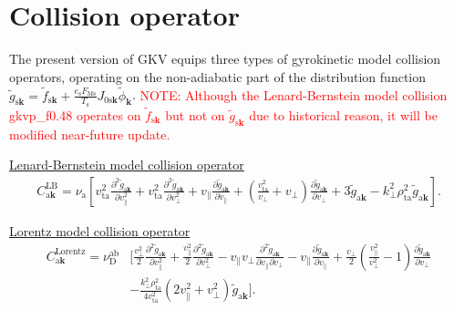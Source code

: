 \section{Collision operator}
\label{sec:Collision operator}

The present version of GKV equips three types of gyrokinetic model collision operators, operating on the non-adiabatic part of the distribution function $\tilde{g}_{\mathrm{s}\bm{k}} = \tilde{f}_{\mathrm{s}\bm{k}} + \frac{e_\mathrm{s} F_\mathrm{Ms}}{T_\mathrm{s}} J_{0\mathrm{s}\bm{k}} \tilde{\phi}_{\bm{k}}$. \textcolor{red}{NOTE: Although the Lenard-Bernstein model collision gkvp\_f0.48 operates on $\tilde{f}_{\mathrm{s}\bm{k}}$ but not on $\tilde{g}_{\mathrm{s}\bm{k}}$ due to historical reason, it will be modified near-future update.}

\underline{Lenard-Bernstein model collision operator}\\
\begin{align}
  C_{\mathrm{a}\bm{k}}^\mathrm{LB} = \nu_\mathrm{a} \left[ v_\mathrm{ta}^2 \frac{\partial^2 \tilde{g}_{\mathrm{a}\bm{k}}}{\partial v_\parallel^2} + v_\mathrm{ta}^2 \frac{\partial^2 \tilde{g}_{\mathrm{a}\bm{k}}}{\partial v_\perp^2} + v_\parallel \frac{\partial \tilde{g}_{\mathrm{a}\bm{k}}}{\partial v_\parallel} + \left(\frac{v_\mathrm{ta}^2}{v_\perp} + v_\perp \right) \frac{\partial \tilde{g}_{\mathrm{a}\bm{k}}}{\partial v_\perp} + 3 \tilde{g}_{\mathrm{a}\bm{k}} - k_\perp^2\rho_\mathrm{ta}^2 \tilde{g}_{\mathrm{a}\bm{k}} \right].
  \label{eq:LB_collision} 
\end{align}

\underline{Lorentz model collision operator}\\
\begin{align}
  C_{\mathrm{a}\bm{k}}^\mathrm{Lorentz} = \nu_\mathrm{D}^\mathrm{ab} &\Bigg[ \frac{v_\perp^2}{2} \frac{\partial^2 \tilde{g}_{\mathrm{a}\bm{k}}}{\partial v_\parallel^2} + \frac{v_\parallel^2}{2} \frac{\partial^2 \tilde{g}_{\mathrm{a}\bm{k}}}{\partial v_\perp^2} - v_\parallel v_\perp  \frac{\partial^2 \tilde{g}_{\mathrm{a}\bm{k}}}{\partial v_\parallel \partial v_\perp} - v_\parallel \frac{\partial \tilde{g}_{\mathrm{a}\bm{k}}}{\partial v_\parallel} + \frac{v_\perp}{2} \left(\frac{v_\parallel^2}{v_\perp^2} - 1 \right) \frac{\partial \tilde{g}_{\mathrm{a}\bm{k}}}{\partial v_\perp} \nonumber \\
&- \frac{k_\perp^2\rho_\mathrm{ta}^2}{4v_\mathrm{ta}^2} (2v_\parallel^2+v_\perp^2) \tilde{g}_{\mathrm{a}\bm{k}} \Bigg].
  \label{eq:Lorentz_collision}
\end{align}

